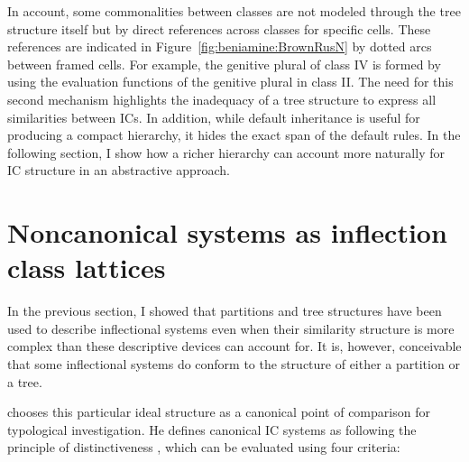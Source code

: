 \documentclass[output=paper]{langscibook}
\begin{document}
    In  account, some commonalities between classes are not modeled through the tree structure itself but by direct references across classes for specific cells. These references are indicated in Figure~\ref{fig:beniamine:BrownRusN} by dotted arcs between framed cells. For example, the genitive plural of class IV is formed by using the evaluation functions of the genitive plural in class II. The need for this second mechanism highlights the inadequacy of a tree structure to express all similarities between ICs. In addition, while default inheritance is useful for producing a compact hierarchy, it hides the exact span of the default rules. In the following section, I show how a richer hierarchy can account more naturally for IC structure in an abstractive approach.
    
    
    \FloatBarrier
    
    \section{Noncanonical systems as inflection class lattices}
    \label{Section:non-canonical-systems-as-inflectional-lattices}
    
    In the previous section, I showed that partitions and tree structures have been used to describe inflectional systems even when their similarity structure is more complex than these descriptive devices can account for. It is, however, conceivable that some inflectional systems do conform to the structure of either a partition or a tree.
    
    \citet{Corbett2009} chooses this particular ideal structure as a canonical point of comparison for typological investigation. He defines canonical IC systems as following the principle of distinctiveness \citep[3]{Corbett2009}, which can be evaluated using four criteria:
    
\end{document}
